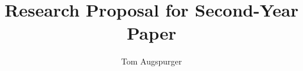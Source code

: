 \documentclass[12pt,a4paper]{article}            %
\begin{document}


\title{Research Proposal for Second-Year Paper}
\author{Tom Augspurger}                               %






\maketitle



\end{document}
